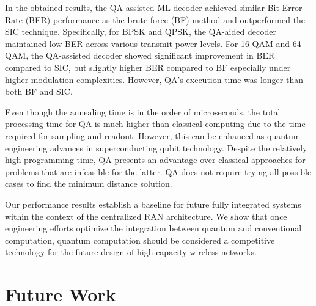 In the obtained results, the QA-assisted ML decoder achieved similar Bit Error Rate (BER) performance as the brute force (BF) method and outperformed the SIC technique. Specifically, for BPSK and QPSK, the QA-aided decoder maintained low BER across various transmit power levels. For 16-QAM and 64-QAM, the QA-assisted decoder showed significant improvement in BER compared to SIC, but slightly higher BER compared to BF especially under higher modulation complexities. However, QA's execution time was longer than both BF and SIC. 

Even though the annealing time is in the order of microseconds, the total processing time for QA is much higher than classical computing due to the time required for sampling and readout. However, this can be enhanced as quantum engineering advances in superconducting qubit technology. Despite the relatively high programming time, QA presents an advantage over classical approaches for problems that are infeasible for the latter. QA does not require trying all possible cases to find the minimum distance solution.

\vspace{0.5cm}

Our performance results establish a baseline for future fully integrated systems within the context of the centralized RAN architecture. We show that once engineering efforts optimize the integration between quantum and conventional computation, quantum computation should be considered a competitive technology for the future design of high-capacity wireless networks.

\section{Future Work}


